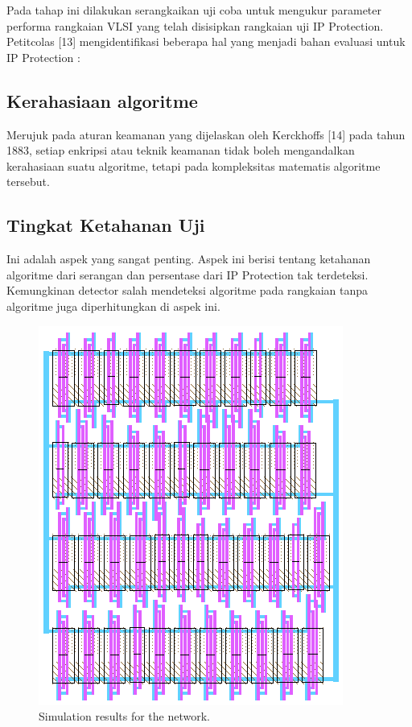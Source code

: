 Pada tahap ini dilakukan serangkaikan uji coba untuk mengukur parameter
performa rangkaian VLSI yang telah disisipkan rangkaian uji IP Protection.
Petitcolas [13] mengidentifikasi beberapa hal yang menjadi bahan evaluasi untuk
IP Protection :

\subsection{Kerahasiaan algoritme}

Merujuk pada aturan keamanan yang dijelaskan oleh Kerckhoffs [14] pada
tahun 1883, setiap enkripsi atau teknik keamanan tidak boleh mengandalkan
kerahasiaan suatu algoritme, tetapi pada kompleksitas matematis algoritme
tersebut.

\subsection{Tingkat Ketahanan Uji}

Ini adalah aspek yang sangat penting. Aspek ini berisi tentang ketahanan
algoritme dari serangan dan persentase dari IP Protection tak terdeteksi.
Kemungkinan detector salah mendeteksi algoritme pada rangkaian tanpa
algoritme juga diperhitungkan di aspek ini.

\begin{figure}[!h]
	\centering
	\includegraphics[scale=0.8]{images/gate1}
	\caption{Simulation results for the network.}
	\label{fig_sim}
\end{figure}

